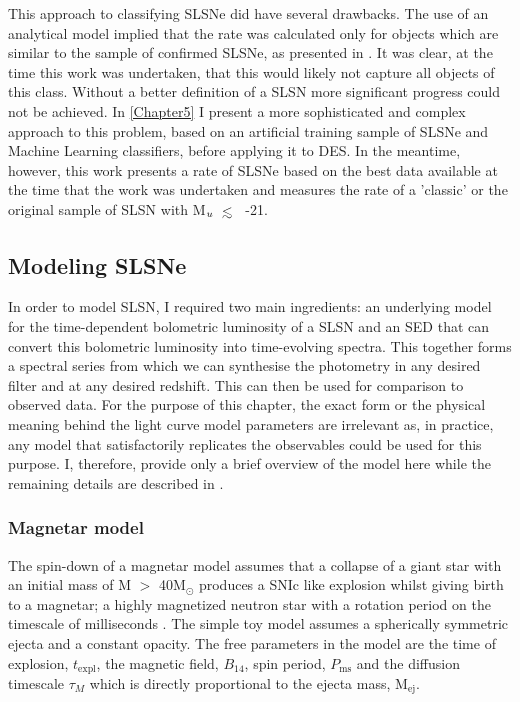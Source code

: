 This approach to classifying SLSNe did have several drawbacks. The use of an analytical model implied that the rate was calculated only for objects which are similar to the sample of confirmed SLSNe, as presented in . It was clear, at the time this work was undertaken, that this would likely not capture all objects of this class. Without a better definition of a SLSN more significant progress could not be achieved. In \cref{Chapter5} I present a more sophisticated and complex approach to this problem, based on an artificial training sample of SLSNe and Machine Learning classifiers, before applying it to DES. In the meantime, however, this work presents a rate of SLSNe based on the best data available at the time that the work was undertaken and measures the rate of a 'classic' or the original sample of SLSN with M$_u~\ltsim $~-21.

\subsection{Modeling SLSNe}
In order to model SLSN, I required two main ingredients: an underlying model for the time-dependent bolometric luminosity of a SLSN and an SED that can convert this bolometric luminosity into time-evolving spectra. This together forms a spectral series from which we can synthesise the photometry in any desired filter and at any desired redshift. This can then be used for comparison to observed data. For the purpose of this chapter, the exact form or the physical meaning behind the light curve model parameters are irrelevant as, in practice, any model that satisfactorily replicates the observables could be used for this purpose. I, therefore, provide only a brief overview of the model here while the remaining details are described in .

\subsubsection{Magnetar model}
The spin-down of a magnetar model assumes that a collapse of a giant star with an initial mass of M $>$ 40M$_{\odot}$ produces a SNIc like explosion whilst giving birth to a magnetar; a highly magnetized neutron star with a rotation period on the timescale of milliseconds \citep{Kasen2009,Woosley2010,Inserra2013}. The simple toy model assumes a spherically symmetric ejecta and a constant opacity. The free parameters in the model are the time of explosion, $t_{\mathrm{expl}}$, the magnetic field, $B_{14}$, spin period, $P_{\mathrm{ms}}$ and the diffusion timescale $\tau_M$ which is directly proportional to the ejecta mass, M$_{\mathrm{ej}}$.


